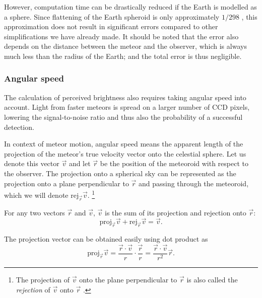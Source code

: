             However, computation time can be drastically reduced if the Earth is modelled as a sphere. Since
            flattening of the Earth spheroid is only approximately $1/298$ \cite{nima2000}, this approximation does not
            result in significant errors compared to other simplifications we have already made.
            It should be noted that the error also depends on the distance between the meteor and the observer,
            which is always much less than the radius of the Earth; and the total error is thus negligible.

        \subsubsection{Angular speed} \label{sim:pmf:sq:as}
            The calculation of perceived brightness also requires taking angular speed into account.
            Light from faster meteors is spread on a larger number of CCD pixels,
            lowering the signal-to-noise ratio and thus also the probability of a successful detection.

            In context of meteor motion, angular speed means the apparent length of the projection of the meteor's
            true velocity vector onto the celestial sphere.
            Let us denote this vector $\vec{v}$ and let $\vec{r}$ be the position of the meteoroid with respect to the observer.
            The projection onto a spherical sky can be represented as the projection onto a plane perpendicular to $\vec{r}$ and
            passing through the meteoroid, which we will denote $\mathrm{rej}_{\vec{r}}\vec{v}$.%
            \footnote{The projection of $\vec{v}$ onto the plane perpendicular to $\vec{r}$ is also called the \emph{rejection}
            of $\vec{v}$ onto $\vec{r}$ \cite{perwass2008}.}
            
            For any two vectors $\vec{r}$ and $\vec{v}$, $\vec{v}$ is the sum of its projection and rejection onto $\vec{r}$:
            \begin{equation}
                \mathrm{proj}_{\vec{r}}\vec{v} + \mathrm{rej}_{\vec{r}}\vec{v} = \vec{v}\text{.}
                \label{sim:pmf:sq:as:rej}
            \end{equation}
            
            The projection vector can be obtained easily using dot product as
            \begin{equation}
                \mathrm{proj}_{\vec{r}}\vec{v} = \frac{\vec{r}\cdot\vec{v}}{r} \cdot \frac{\vec{r}}{r} = \frac{\vec{r}\cdot\vec{v}}{r^2}\vec{r}\text{.}            
                \label{sim:pmf:sq:as:proj}
            \end{equation}
            
